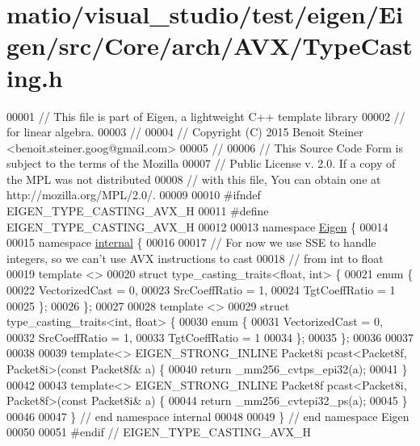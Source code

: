 \hypertarget{matio_2visual__studio_2test_2eigen_2_eigen_2src_2_core_2arch_2_a_v_x_2_type_casting_8h_source}{}\section{matio/visual\+\_\+studio/test/eigen/\+Eigen/src/\+Core/arch/\+A\+V\+X/\+Type\+Casting.h}
\label{matio_2visual__studio_2test_2eigen_2_eigen_2src_2_core_2arch_2_a_v_x_2_type_casting_8h_source}

\begin{DoxyCode}
00001 \textcolor{comment}{// This file is part of Eigen, a lightweight C++ template library}
00002 \textcolor{comment}{// for linear algebra.}
00003 \textcolor{comment}{//}
00004 \textcolor{comment}{// Copyright (C) 2015 Benoit Steiner <benoit.steiner.goog@gmail.com>}
00005 \textcolor{comment}{//}
00006 \textcolor{comment}{// This Source Code Form is subject to the terms of the Mozilla}
00007 \textcolor{comment}{// Public License v. 2.0. If a copy of the MPL was not distributed}
00008 \textcolor{comment}{// with this file, You can obtain one at http://mozilla.org/MPL/2.0/.}
00009 
00010 \textcolor{preprocessor}{#ifndef EIGEN\_TYPE\_CASTING\_AVX\_H}
00011 \textcolor{preprocessor}{#define EIGEN\_TYPE\_CASTING\_AVX\_H}
00012 
00013 \textcolor{keyword}{namespace }\hyperlink{namespace_eigen}{Eigen} \{
00014 
00015 \textcolor{keyword}{namespace }\hyperlink{namespaceinternal}{internal} \{
00016 
00017 \textcolor{comment}{// For now we use SSE to handle integers, so we can't use AVX instructions to cast}
00018 \textcolor{comment}{// from int to float}
00019 \textcolor{keyword}{template} <>
00020 \textcolor{keyword}{struct }type\_casting\_traits<float, int> \{
00021   \textcolor{keyword}{enum} \{
00022     VectorizedCast = 0,
00023     SrcCoeffRatio = 1,
00024     TgtCoeffRatio = 1
00025   \};
00026 \};
00027 
00028 \textcolor{keyword}{template} <>
00029 \textcolor{keyword}{struct }type\_casting\_traits<int, float> \{
00030   \textcolor{keyword}{enum} \{
00031     VectorizedCast = 0,
00032     SrcCoeffRatio = 1,
00033     TgtCoeffRatio = 1
00034   \};
00035 \};
00036 
00037 
00038 
00039 \textcolor{keyword}{template}<> EIGEN\_STRONG\_INLINE Packet8i pcast<Packet8f, Packet8i>(\textcolor{keyword}{const} Packet8f& a) \{
00040   \textcolor{keywordflow}{return} \_mm256\_cvtps\_epi32(a);
00041 \}
00042 
00043 \textcolor{keyword}{template}<> EIGEN\_STRONG\_INLINE Packet8f pcast<Packet8i, Packet8f>(\textcolor{keyword}{const} Packet8i& a) \{
00044   \textcolor{keywordflow}{return} \_mm256\_cvtepi32\_ps(a);
00045 \}
00046 
00047 \} \textcolor{comment}{// end namespace internal}
00048 
00049 \} \textcolor{comment}{// end namespace Eigen}
00050 
00051 \textcolor{preprocessor}{#endif // EIGEN\_TYPE\_CASTING\_AVX\_H}
\end{DoxyCode}

